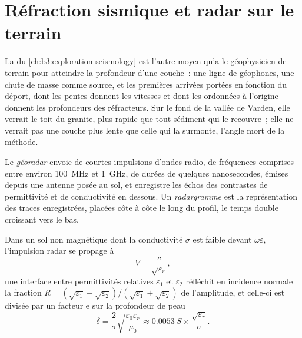 \section{Réfraction sismique et radar sur le terrain}\label{sec:b3:field-lab-methods-3:radar}

La  du \cref{ch:b3:exploration-seismology}
est l'autre moyen qu'a le géophysicien de terrain pour atteindre la profondeur d'une couche~: une ligne
de géophones, une chute de masse comme source, et les premières arrivées
portées en fonction du déport, dont les pentes donnent les vitesses et dont
les ordonnées à l'origine donnent les profondeurs des réfracteurs. Sur le fond de la vallée de Varden, elle
verrait le toit du granite, plus rapide que tout sédiment qui le recouvre~; elle
ne verrait pas une couche plus lente que celle qui la surmonte, l'angle mort de la
méthode.

\begin{definition}\label{def:b3:field-lab-methods-3:gpr}
Le \emph{géoradar} envoie
de courtes impulsions d'ondes radio, de fréquences comprises entre environ \qty{100}{MHz}
et \qty{1}{GHz}, de durées de quelques nanosecondes, émises depuis une antenne posée au
sol, et enregistre les échos des contrastes de permittivité et
de conductivité en dessous. Un \emph{radargramme} est la représentation
des traces enregistrées, placées côte à côte le long du profil, le temps double
croissant vers le bas.
\end{definition}

\begin{proposition}\label{prop:b3:field-lab-methods-3:radar}
Dans un sol non magnétique dont la conductivité $\sigma$ est faible devant
$\omega\varepsilon$, l'impulsion radar se propage à
\[
V = \frac{c}{\sqrt{\varepsilon_r}} ,
\]
une interface entre permittivités relatives $\varepsilon_1$ et
$\varepsilon_2$ réfléchit en incidence normale la fraction $R =
(\sqrt{\varepsilon_1} - \sqrt{\varepsilon_2})/(\sqrt{\varepsilon_1} +
\sqrt{\varepsilon_2})$ de l'amplitude, et celle-ci est divisée par un
facteur $\mathrm{e}$ sur la profondeur de peau
\[
\delta = \frac{2}{\sigma}\sqrt{\frac{\varepsilon_0\varepsilon_r}{\mu_0}}
       \approx \qty{0.0053}{S}\times\frac{\sqrt{\varepsilon_r}}{\sigma} .
\]
\end{proposition}

